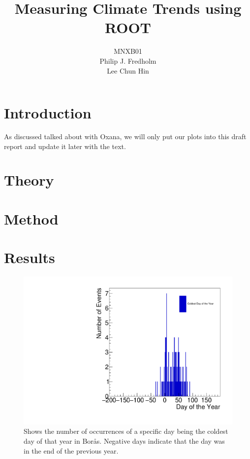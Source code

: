 \documentclass[a4, 12pt]{article}
\title{Measuring Climate Trends using ROOT}
\author{MNXB01 \\ Philip J. Fredholm \\Lee Chun Hin }
\begin{document}
\maketitle
\tableofcontents
\newpage

\section{Introduction}
As discussed talked about with Oxana, we will only put our plots into this draft report and update it later with the text.


\section{Theory}
\section{Method}
\section{Results}


\begin{figure}[H]
\centering
\includegraphics[scale=0.50]{philipCold.pdf}
\caption{Shows the number of occurrences of a specific day being the coldest day of that year in Borås. Negative days indicate that the day was in the end of the previous year.}
\end{figure}
\end{document}
